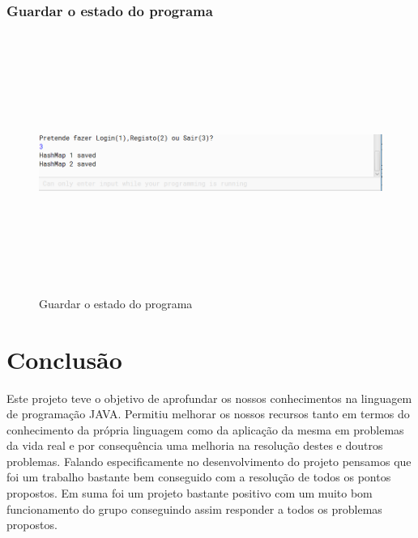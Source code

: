 \documentclass[a4paper]{article}
\begin{document}
		\subsubsection{Guardar o estado do programa}
			\begin{figure}[htbp]
						\centering
						\includegraphics[width = 320pt,height = 240pt]{savestate.png}
						\caption{Guardar o estado do programa}
					\end{figure}
			


\section{Conclusão}
\label{sec:conclusao}

Este projeto teve o objetivo de aprofundar os nossos conhecimentos na linguagem de programação JAVA. Permitiu melhorar os nossos recursos tanto em termos do conhecimento da própria linguagem como da aplicação da mesma em problemas da vida real e por consequência uma melhoria na resolução destes e doutros problemas.
Falando especificamente no desenvolvimento do projeto pensamos que foi um trabalho bastante bem conseguido com a resolução de todos os pontos propostos. Em suma foi um projeto bastante positivo com um muito bom funcionamento do grupo conseguindo assim responder a todos os problemas propostos.
\end{document}
